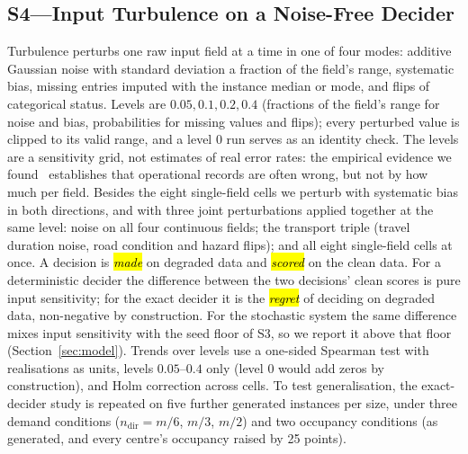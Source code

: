 \documentclass[systems,article,accept,moreauthors,pdftex]{Definitions/mdpi}
\begin{document}
\subsection{S4---Input Turbulence on a Noise-Free Decider}
Turbulence perturbs one raw input field at a time in one of four modes: additive Gaussian
noise with standard deviation a fraction of the field's range, systematic bias, missing
entries imputed with the instance median or mode, and flips of categorical status. Levels
are $0.05, 0.1, 0.2, 0.4$ (fractions of the field's range for noise and bias, probabilities
for missing values and flips); every perturbed value is clipped to its valid range, and a level
$0$ run serves as an identity check. The levels are a sensitivity grid, not estimates of
real error rates: the empirical evidence we found~\cite{dehoratius2008inventory,altay2014haiti}
establishes that operational records are often wrong, but not by how much per field. Besides
the eight single-field cells we perturb with systematic bias in both directions, and with
three joint perturbations applied together at the same level: noise on all four continuous
fields; the transport triple (travel duration noise, road condition and hazard flips); and all
eight single-field cells at once. A decision is \emph{\hl{made}%
} on degraded data and \emph{\hl{scored}%
}
on the clean data. For a deterministic decider the difference between the two decisions' clean
scores is pure input sensitivity; for the exact decider it is the \emph{\hl{regret}%
} of deciding on
degraded data, non-negative by construction. For the stochastic system the same difference
mixes input sensitivity with the seed floor of S3, so we report it above that floor
(Section~\ref{sec:model}). Trends over levels use a one-sided Spearman test with realisations
as units, levels $0.05$--$0.4$ only (level $0$ would add zeros by construction), and Holm
correction across cells. To test generalisation, the exact-decider study is repeated on five
further generated instances per size, under three demand conditions ($n_{\mathrm{dir}} = m/6$,
$m/3$, $m/2$) and two occupancy conditions (as generated, and every centre's occupancy raised
by 25 points).
\end{document}
